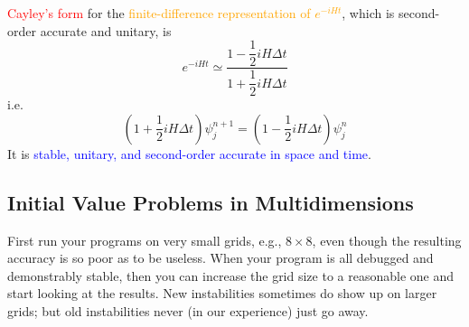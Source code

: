 \documentclass[12pt,a4paper]{article}
\begin{document}
\textcolor{red}{Cayley's form} for the \textcolor{orange}{finite-difference representation of $e^{-iHt}$}, which is second-order accurate and unitary, is
\begin{equation}
e^{-iHt} \simeq \frac{1-\dfrac{1}{2} iH \Delta t}{1+\dfrac{1}{2} iH \Delta t}
\end{equation}
i.e.
\begin{equation}
(1+\dfrac{1}{2} iH \Delta t) \psi_j^{n+1} = (1-\dfrac{1}{2} iH \Delta t) \psi_j^n
\end{equation}
It is \textcolor{blue}{stable, unitary, and second-order accurate in space and time}.

\subsection{Initial Value Problems in Multidimensions}
First run your programs on very small grids, e.g., $8\times 8$, even though the resulting accuracy is so poor as to be useless. When your program is all debugged and demonstrably stable, then you can increase the grid size to a reasonable one and start looking at the results. New instabilities sometimes do show up on larger grids; but old instabilities never (in our experience) just go away.
\end{document}
